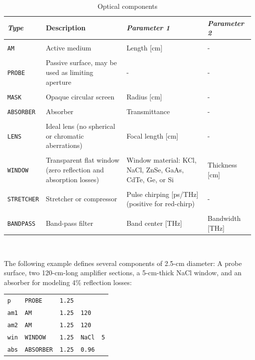 \documentclass{report}
\begin{document}
\begin{table}
\caption{Optical components}
\label{table:components}
\def\tabularxcolumn#1{m{#1}}
\begin{tabularx}{\textwidth}{|l|X|X|X|}
\hline 
\textit{\textbf{Type}} & Description & \textit{\textbf{Parameter 1}} & \textit{\textbf{Parameter 2}} \\
\hline 
&&&\\
\texttt{AM}	& Active medium	& Length [cm]	& - \\
&&&\\
\texttt{PROBE} & Passive surface, may be used as limiting aperture &	- &	-\\
&&&\\
\texttt{MASK} & Opaque circular screen & Radius [cm] & -\\
&&&\\
\texttt{ABSORBER} & Absorber & Transmittance & -\\
&&&\\
\texttt{LENS} & Ideal lens (no spherical or chromatic aberrations)& Focal length [cm]& -\\
&&&\\
\texttt{WINDOW} & Transparent flat window (zero reflection and absorption losses) & Window material: KCl, NaCl, ZnSe, GaAs, CdTe, Ge, or Si & Thickness [cm]\\
&&&\\
\texttt{STRETCHER} & Stretcher or compressor & Pulse chirping [ps/THz] (positive for red-chirp) & -\\
&&&\\
\texttt{BANDPASS} & Band-pass filter & Band center [THz] & Bandwidth [THz]\\
\hline
\end{tabularx}\\
\end{table}


The following example defines several components of 2.5-cm diameter: A probe surface, two 120-cm-long amplifier sections, a 5-cm-thick NaCl window, and an absorber for modeling 4\% reflection losses:

\bigskip
\begin{tabular}{lllll}
\texttt{p}   & \texttt{PROBE}    & \texttt{1.25} &               &           \\
\texttt{am1} & \texttt{AM}       & \texttt{1.25} & \texttt{120}  &           \\
\texttt{am2} & \texttt{AM}       & \texttt{1.25} & \texttt{120}  &           \\
\texttt{win} & \texttt{WINDOW}   & \texttt{1.25} & \texttt{NaCl} & \texttt{5}\\
\texttt{abs} & \texttt{ABSORBER} & \texttt{1.25} & \texttt{0.96} &
\end{tabular}
\end{document}
